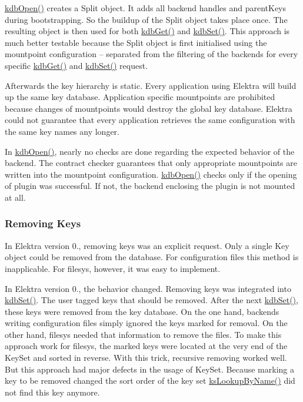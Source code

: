 {\ttfamily \hyperlink{group__kdb_ga6808defe5870f328dd17910aacbdc6ca}{kdb\+Open()}} creates a {\ttfamily Split} object. It adds all backend handles and {\ttfamily parent\+Keys} during bootstrapping. So the buildup of the {\ttfamily Split} object takes place once. The resulting object is then used for both {\ttfamily \hyperlink{group__kdb_ga28e385fd9cb7ccfe0b2f1ed2f62453a1}{kdb\+Get()}} and {\ttfamily \hyperlink{group__kdb_ga11436b058408f83d303ca5e996832bcf}{kdb\+Set()}}. This approach is much better testable because the {\ttfamily Split} object is first initialised using the mountpoint configuration -- separated from the filtering of the backends for every specific {\ttfamily \hyperlink{group__kdb_ga28e385fd9cb7ccfe0b2f1ed2f62453a1}{kdb\+Get()}} and {\ttfamily \hyperlink{group__kdb_ga11436b058408f83d303ca5e996832bcf}{kdb\+Set()}} request.

Afterwards the key hierarchy is static. Every application using Elektra will build up the same key database. Application specific mountpoints are prohibited because changes of mountpoints would destroy the global key database. Elektra could not guarantee that every application retrieves the same configuration with the same key names any longer.

In {\ttfamily \hyperlink{group__kdb_ga6808defe5870f328dd17910aacbdc6ca}{kdb\+Open()}}, nearly no checks are done regarding the expected behavior of the backend. The contract checker guarantees that only appropriate mountpoints are written into the mountpoint configuration. {\ttfamily \hyperlink{group__kdb_ga6808defe5870f328dd17910aacbdc6ca}{kdb\+Open()}} checks only if the opening of plugin was successful. If not, the backend enclosing the plugin is not mounted at all.

\subsubsection*{Removing Keys}

In Elektra version 0., removing keys was an explicit request. Only a single {\ttfamily Key} object could be removed from the database. For configuration files this method is inapplicable. For {\ttfamily filesys}, however, it was easy to implement.

In Elektra version 0., the behavior changed. Removing keys was integrated into {\ttfamily \hyperlink{group__kdb_ga11436b058408f83d303ca5e996832bcf}{kdb\+Set()}}. The user tagged keys that should be removed. After the next {\ttfamily \hyperlink{group__kdb_ga11436b058408f83d303ca5e996832bcf}{kdb\+Set()}}, these keys were removed from the key database. On the one hand, backends writing configuration files simply ignored the keys marked for removal. On the other hand, {\ttfamily filesys} needed that information to remove the files. To make this approach work for {\ttfamily filesys}, the marked keys were located at the very end of the {\ttfamily Key\+Set} and sorted in reverse. With this trick, recursive removing worked well. But this approach had major defects in the usage of {\ttfamily Key\+Set}. Because marking a key to be removed changed the sort order of the key set {\ttfamily \hyperlink{group__keyset_gad2e30fb6d4739d917c5abb2ac2f9c1a1}{ks\+Lookup\+By\+Name()}} did not find this key anymore.

